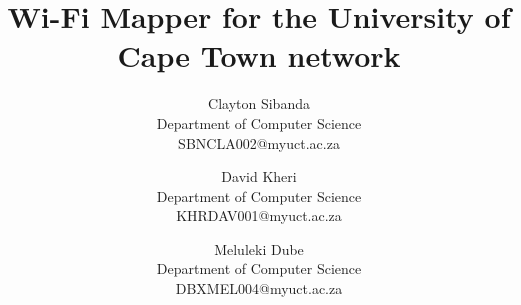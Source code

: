 \documentclass[11pt,a4paper]{article}
\begin{document}
\title{Wi-Fi Mapper for the University of Cape Town network} \date{}
\author{Clayton Sibanda\\Department of Computer Science\\SBNCLA002@myuct.ac.za
\and David Kheri\\Department of Computer Science\\KHRDAV001@myuct.ac.za
\and Meluleki Dube\\Department of Computer Science\\DBXMEL004@myuct.ac.za}

\chead{}
\lfoot{}
\cfoot{\thepage}    %
\rfoot{}
\renewcommand{\headrulewidth}{0.0pt}   %
\maketitle
\thispagestyle{plain}  %









\end{document}
